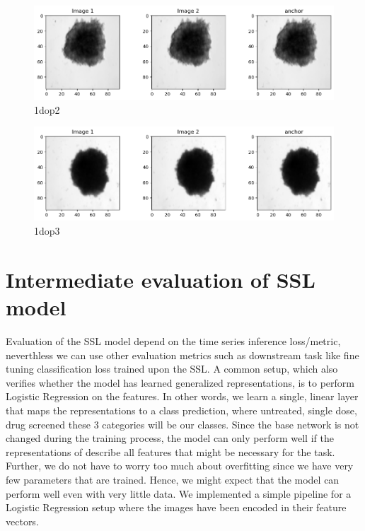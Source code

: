 \documentclass[12pt,twoside,a4paper,parskip]{scrbook} %
\begin{document}
\begin{figure}[H]
  \centering
  \includegraphics[width=0.9\linewidth]{figures/1dop2.png} %
  \caption{1dop2}
  \label{fig:1doutput2}
\end{figure}

\begin{figure}[H]
  \centering
  \includegraphics[width=0.9\linewidth]{figures/1dop3.png} %
  \caption{1dop3}
  \label{fig:1doutput3}
\end{figure}
\section{Intermediate evaluation of SSL model}
Evaluation of the SSL model depend on the  time series inference loss/metric, neverthless we can use other evaluation metrics such as downstream task like fine tuning classification loss trained upon the SSL. A common setup, which also verifies whether the model has learned generalized representations, is to perform Logistic Regression on the features. In other words, we learn a single, linear layer that maps the representations to a class prediction, where untreated, single dose, drug screened these 3 categories will be our classes. Since the base network is not changed during the training process, the model can only perform well if the representations of describe all features that might be necessary for the task. Further, we do not have to worry too much about overfitting since we have very few parameters that are trained. Hence, we might expect that the model can perform well even with very little data. We implemented a  simple pipeline for a  Logistic Regression setup where the images have been encoded in their feature vectors. 
\end{document}
